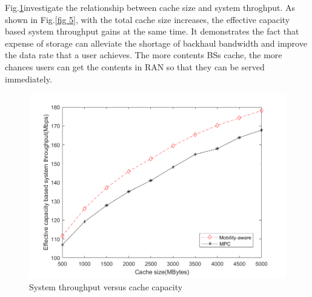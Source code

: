 \documentclass[conference]{IEEEtran}
\begin{document}
Fig.\ref{fig 4}investigate the relationship between cache size and system throghput. As shown in Fig.\ref{fig 5}, with the total cache size increases, the effective capacity based system throughput gains at the same time. It demonstrates the fact that expense of storage can alleviate the shortage of backhaul bandwidth and improve the data rate that a user achieves. The more contents BSs cache, the more chances users can get the contents in RAN so that they can be served immediately.
\begin{figure}[htbp]
 \centerline{\includegraphics[scale=0.3]{fig4.png}}
 \caption{System throughput versus cache capacity}
 \label{fig 4}
\end{figure}
\end{document}

